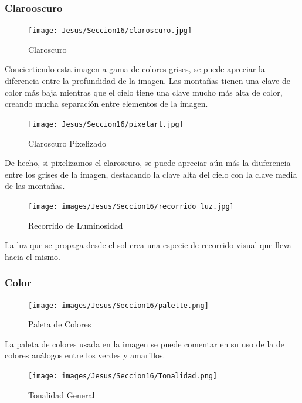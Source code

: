 \documentclass[12pt]{article}
\begin{document}
        \subsubsection{Clarooscuro}
          \begin{figure}[H]
            \centering
            \texttt{[image: Jesus/Seccion16/claroscuro.jpg]}
            \caption{Claroscuro}
          \end{figure}

          Conciertiendo esta imagen a gama de colores grises, se puede apreciar la diferencia entre la profundidad de la imagen. 
          Las montañas tienen una clave de color más baja mientras que el cielo tiene una clave mucho más alta de color, creando mucha separación entre elementos de la imagen. 

          \begin{figure}[H]
            \centering
            \texttt{[image: Jesus/Seccion16/pixelart.jpg]}
            \caption{Claroscuro Pixelizado}
          \end{figure}

          De hecho, si pixelizamos el claroscuro, se puede apreciar aún más la diuferencia entre los grises de la imagen, destacando la clave alta del cielo con la clave media de las montañas.

          \begin{figure}[H]
            \centering
            \texttt{[image: images/Jesus/Seccion16/recorrido luz.jpg]}
            \caption{Recorrido de Luminosidad}
          \end{figure}  

          La luz que se propaga desde el sol crea una especie de recorrido visual que lleva hacia el mismo. 


        \subsubsection{Color}

          \begin{figure}[H]
            \centering
            \texttt{[image: images/Jesus/Seccion16/palette.png]}
            \caption{Paleta de Colores}
          \end{figure} 

          La paleta de colores usada en la imagen se puede comentar en su uso de la de colores análogos entre los verdes y amarillos.

          \begin{figure}[H]
            \centering
            \texttt{[image: images/Jesus/Seccion16/Tonalidad.png]}
            \caption{Tonalidad General}
          \end{figure} 
\end{document}
